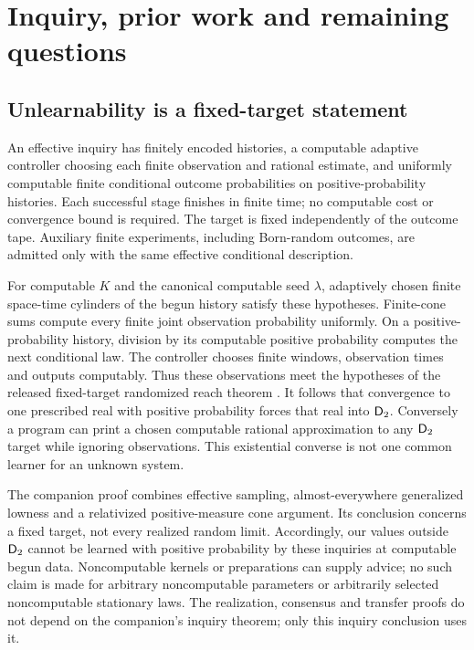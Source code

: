 \section{Inquiry, prior work and remaining questions}\label{sec:scope}
\subsection{Unlearnability is a fixed-target statement}\label{subsec:reach}
An effective inquiry has finitely encoded histories, a computable
adaptive controller choosing each finite observation and rational
estimate, and uniformly computable finite conditional outcome
probabilities on positive-probability histories. Each successful
stage finishes in finite time; no computable cost or convergence
bound is required. The target is fixed independently of the outcome
tape. Auxiliary finite experiments, including Born-random outcomes,
are admitted only with the same effective conditional description.

For computable $K$ and the canonical computable seed $\lambda$,
adaptively chosen finite space-time cylinders of the begun history
satisfy these hypotheses. Finite-cone sums compute every finite
joint observation probability uniformly. On a positive-probability
history, division by its computable positive probability computes
the next conditional law. The controller chooses finite windows,
observation times and outputs computably. Thus these observations
meet the hypotheses of the released fixed-target randomized reach
theorem \cite[Theorem~21.1]{criticalcurrent}. It follows that
convergence to one prescribed real with positive probability
forces that real into $\mathsf D_2$. Conversely a program can print a
chosen computable rational approximation to any $\mathsf D_2$ target
while ignoring observations. This existential converse is not
one common learner for an unknown system.

The companion proof combines effective sampling, almost-everywhere
generalized lowness and a relativized positive-measure cone
argument. Its conclusion concerns a fixed target, not every
realized random limit. Accordingly, our values outside $\mathsf D_2$
cannot be learned with positive probability by these inquiries at
computable begun data. Noncomputable kernels or preparations can
supply advice; no such claim is made for arbitrary noncomputable
parameters or arbitrarily selected noncomputable stationary laws.
The realization, consensus and transfer proofs do not depend on
the companion's inquiry theorem; only this inquiry conclusion
uses it.

